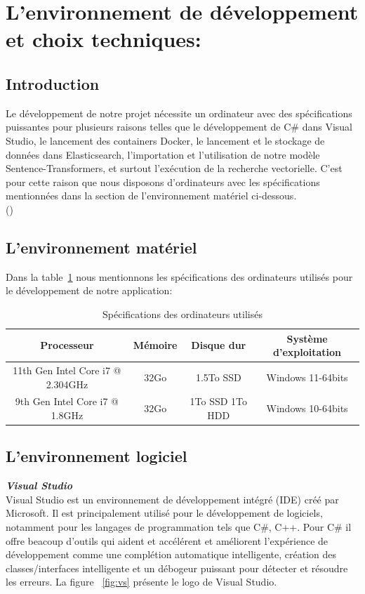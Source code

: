 \section{L'environnement de développement et choix techniques: }

\subsection{Introduction}
\noindent
Le développement de notre projet nécessite un ordinateur avec des spécifications puissantes pour plusieurs raisons telles que le développement de C\# dans Visual Studio, le lancement des containers Docker, le lancement et le stockage de données dans Elasticsearch, l'importation et l'utilisation de notre modèle Sentence-Transformers, et surtout l'exécution de la recherche vectorielle. C'est pour cette raison que nous disposons d'ordinateurs avec les spécifications mentionnées dans la section  de l'environnement matériel ci-dessous. \\
 (\cite{elastic:hardwarespecifications})

\subsection{L'environnement matériel}
\noindent
Dans la table~\ref{tab:compspec} nous mentionnons les spécifications des ordinateurs utilisés pour le développement de notre application: 

\begin{table}[H]
\centering
\begin{tabular}{|c|c|c|c|}
\hline
\rowcolor{blue!20}
\textbf{Processeur} & \textbf{Mémoire} & \textbf{Disque dur} & \textbf{Système d'exploitation} \\
\hline
11th Gen Intel Core i7 @ 2.304GHz & 32Go & 1.5To SSD & Windows 11-64bits \\
\hline
9th Gen Intel Core i7 @ 1.8GHz & 32Go & 1To SSD 1To HDD & Windows 10-64bits \\
\hline
\end{tabular}
\caption{Spécifications des ordinateurs utilisés}
\label{tab:compspec}
\end{table}

\newpage
\subsection{L'environnement logiciel}
\noindent
{\small\textbf{\textit{Visual Studio}}}\mbox{}\\
Visual Studio est un environnement de développement intégré (IDE) créé par Microsoft. Il est principalement utilisé pour le développement de logiciels, notamment pour les langages de programmation tels que C\#, C++. Pour C\# il offre beacoup d'outils qui aident et accélérent et améliorent l'expérience de développement comme une complétion automatique intelligente, création des classes/interfaces intelligente et un débogeur puissant pour détecter et résoudre les erreurs. La figure ~\ref{fig:vs} présente le logo de Visual Studio.

